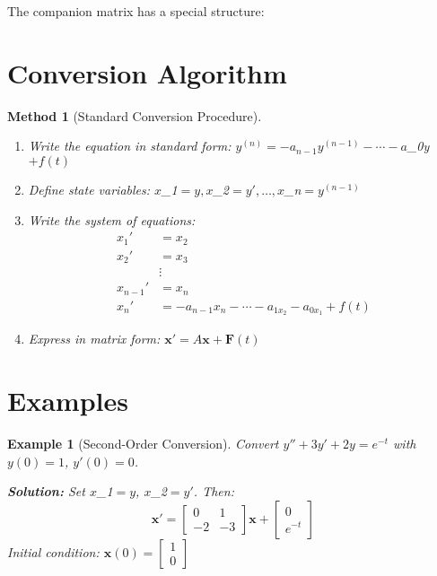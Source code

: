 \documentclass[12pt]{article}
\newtheorem{method}{Method}
\newtheorem{example}{Example}
\begin{document}
\begin{insight}
The companion matrix has a special structure:
\end{insight}

\section{Conversion Algorithm}

\begin{method}[Standard Conversion Procedure]
\begin{enumerate}
\item Write the equation in standard form: $y^{(n)} = -a_{n-1}y^{(n-1)} - \cdots - a$_{0y}$ + f(t)$
\item Define state variables: $x$_{1}$ = y, x$_{2}$ = y', \ldots, x$_{n}$ = y^{(n-1)}$
\item Write the system of equations:
\begin{align}
x_{1}' &= x_{2} \\
x_{2}' &= x_{3} \\
&\vdots \\
x_{n-1}' &= x_{n} \\
x_{n}' &= -a_{n-1}x_{n} - \cdots - a_{1x}_2 - a_{0x}_1 + f(t)
\end{align}
\item Express in matrix form: $\mathbf{x}' = A\mathbf{x} + \mathbf{F}(t)$
\end{enumerate}
\end{method}

\section{Examples}

\begin{example}[Second-Order Conversion]
Convert $y'' + 3y' + 2y = e^{-t}$ with $y(0) = 1$, $y'(0) = 0$.

\textbf{Solution:}
Set $x$_{1}$ = y$, $x$_{2}$ = y'$. Then:
$$\mathbf{x}' = \begin{bmatrix} 0 & 1 \\ -2 & -3 \end{bmatrix}\mathbf{x} + \begin{bmatrix} 0 \\ e^{-t} \end{bmatrix}$$
Initial condition: $\mathbf{x}(0) = \begin{bmatrix} 1 \\ 0 \end{bmatrix}$
\end{example}
\end{document}
